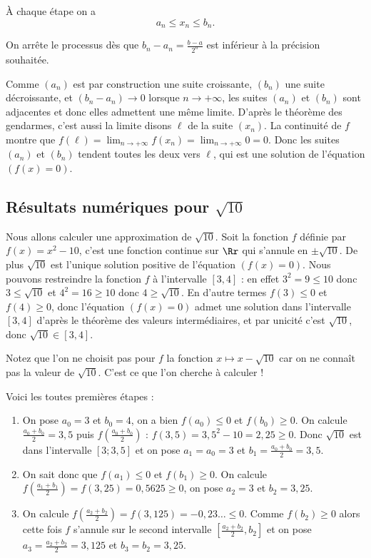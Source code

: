\documentclass[class=report,crop=false]{standalone}
\begin{document}
\`A chaque étape on a
$$a_n \le x_n \le b_n.$$

On arrête le processus dès que $b_n-a_n=\frac{b-a}{2^n}$ est inférieur à la précision souhaitée.


Comme $(a_n)$ est par construction une suite croissante, $(b_n)$ une suite décroissante,
et $(b_n-a_n) \to 0$ lorsque $n\to +\infty$, les suites $(a_n)$ et $(b_n)$ sont
adjacentes et donc elles admettent une même limite. D'après le théorème des gendarmes,
c'est aussi la limite disons $\ell$ de la suite $(x_n)$. La continuité de $f$ montre
que $f(\ell)=\lim_{n\to +\infty} f(x_n)=\lim_{n\to +\infty} 0 =0$.
Donc les suites $(a_n)$ et $(b_n)$ tendent toutes les deux vers $\ell$,
qui est une solution de l'équation $(f(x)=0)$.


\subsection{Résultats numériques pour $\sqrt{10}$}

Nous allons calculer une approximation de $\sqrt{10}$.
Soit la fonction $f$ définie par $f(x)=x^2 - 10$, c'est une fonction continue sur $\Rr$
qui s'annule en $\pm\sqrt{10}$. De plus $\sqrt{10}$ est l'unique solution positive de l'équation $(f(x)=0)$.
Nous pouvons restreindre la fonction $f$ à l'intervalle $[3,4]$ : en effet $3^2=9\le 10$ donc $3 \le \sqrt{10}$ et $4^2 = 16 \ge 10$ donc $4 \ge \sqrt{10}$. En d'autre termes $f(3) \le 0$ et $f(4) \ge 0$, donc l'équation $(f(x)=0)$ admet une solution dans l'intervalle $[3,4]$ d'après le théorème des valeurs intermédiaires, et par unicité c'est $\sqrt{10}$, donc $\sqrt{10} \in [3,4]$.

Notez que l'on ne choisit pas pour $f$ la fonction $x\mapsto x-\sqrt{10}$ car on ne connaît pas la valeur de $\sqrt{10}$. C'est ce que l'on cherche à calculer !


Voici les toutes premières étapes :
\begin{enumerate}
  \item On pose $a_0=3$ et $b_0=4$, on a bien $f(a_0)\le 0$ et $f(b_0) \ge 0$.
On calcule $\frac{a_0+b_0}{2} = 3,5$ puis $f(\frac{a_0+b_0}{2})$ :
$f(3,5)=3,5^2-10 = 2,25 \ge0$. Donc $\sqrt{10}$ est dans l'intervalle
$[3 ; 3,5]$ et on pose $a_1 = a_0 = 3$ et $b_1 = \frac{a_0+b_0}{2} = 3,5$.

  \item On sait donc que $f(a_1) \le 0$ et $f(b_1) \ge0$. On calcule
  $f(\frac{a_1+b_1}{2})=f(3,25)=0,5625 \ge 0$, on pose $a_2=3$ et $b_2=3,25$.

  \item On calcule $f(\frac{a_2+b_2}{2})=f(3,125)=-0,23\ldots \le 0$.
  Comme $f(b_2) \ge 0$ alors cette fois $f$ s'annule sur le second intervalle
  $[\frac{a_2+b_2}{2},b_2]$ et on pose $a_3=\frac{a_2+b_2}{2}=3,125$ et $b_3=b_2=3,25$.
\end{enumerate}
\end{document}
